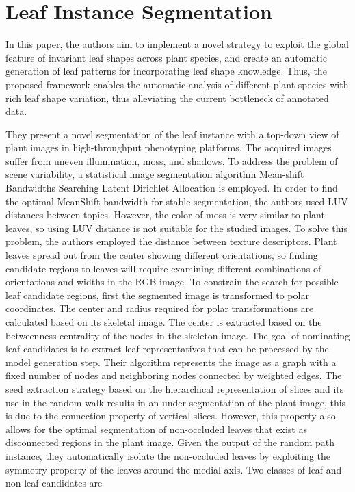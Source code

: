 \section{Leaf Instance Segmentation}
In this paper, the authors aim to implement a novel strategy to exploit the global feature of invariant leaf shapes across plant species,
and create an automatic generation of leaf patterns for incorporating leaf shape knowledge. Thus, the proposed framework enables the automatic
analysis of different plant species with rich leaf shape variation, thus alleviating the current bottleneck of annotated data.

They present a novel segmentation of the leaf instance with a top-down view of plant images in high-throughput phenotyping platforms.
The acquired images suffer from uneven illumination, moss, and shadows. To address the problem of scene variability, a statistical
image segmentation algorithm Mean-shift Bandwidths Searching Latent Dirichlet Allocation is employed. In order to find the optimal
MeanShift bandwidth for stable segmentation, the authors used LUV distances between topics. However, the color of moss is very similar
to plant leaves, so using LUV distance is not suitable for the studied images. To solve this problem, the authors employed the distance between
texture descriptors.
Plant leaves spread out from the center showing different orientations, so finding candidate regions to leaves will require examining different
combinations of orientations and widths in the RGB image. To constrain the search for possible leaf candidate regions, first the segmented image
is transformed to polar coordinates. The center and radius required for polar transformations are calculated based on its skeletal image. The center
is extracted based on the betweenness centrality of the nodes in the skeleton image. The goal of nominating leaf candidates is to extract leaf representatives
that can be processed by the model generation step. Their algorithm represents the image as a graph with a fixed number of nodes and neighboring nodes
connected by weighted edges. The seed extraction strategy based on the hierarchical representation of slices and its use in the random walk results in
an under-segmentation of the plant image, this is due to the connection property of vertical slices. However, this property also allows for the optimal
segmentation of non-occluded leaves that exist as disconnected regions in the plant image. Given the output of the random path instance, they automatically
isolate the non-occluded leaves by exploiting the symmetry property of the leaves around the medial axis. Two classes of leaf and non-leaf candidates are
